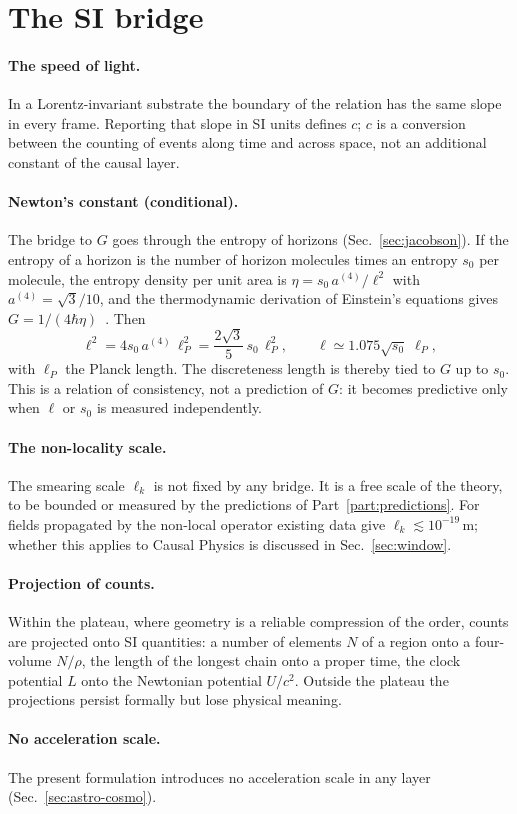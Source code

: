 \section{The SI bridge}\label{sec:bridge}

\paragraph{The speed of light.} In a Lorentz-invariant substrate the boundary of the relation has
the same slope in every frame. Reporting that slope in SI units defines $c$; $c$ is a conversion
between the counting of events along time and across space, not an additional constant of the
causal layer.

\paragraph{Newton's constant (conditional).} The bridge to $G$ goes through the entropy of horizons
(Sec.~\ref{sec:jacobson}). If the entropy of a horizon is the number of horizon molecules times an
entropy $s_0$ per molecule, the entropy density per unit area is $\eta=s_0\,a^{(4)}/\ell^2$ with
$a^{(4)}=\sqrt3/10$, and the thermodynamic derivation of Einstein's equations gives
$G=1/(4\hbar\eta)$~\cite{Jacobson1995}. Then
\begin{equation}\label{eq:lP}
  \ell^2=4s_0\,a^{(4)}\,\ell_P^2=\frac{2\sqrt3}{5}\,s_0\,\ell_P^2,\qquad
  \ell\simeq1.075\sqrt{s_0}\;\ell_P ,
\end{equation}
with $\ell_P$ the Planck length. The discreteness length is thereby tied to $G$ up to $s_0$. This is a
relation of consistency, not a prediction of $G$: it becomes predictive only when $\ell$ or $s_0$ is
measured independently.

\paragraph{The non-locality scale.} The smearing scale $\ell_k$ is not fixed by any bridge. It is a
free scale of the theory, to be bounded or measured by the predictions of Part~\ref{part:predictions}. For
fields propagated by the non-local operator existing data give $\ell_k\lesssim10^{-19}$\,m; whether this
applies to Causal Physics is discussed in Sec.~\ref{sec:window}.

\paragraph{Projection of counts.} Within the plateau, where geometry is a reliable compression of
the order, counts are projected onto SI quantities: a number of elements $N$ of a region onto a
four-volume $N/\rho$, the length of the longest chain onto a proper time, the clock potential $L$
onto the Newtonian potential $U/c^2$. Outside the plateau the projections persist formally but lose
physical meaning.

\paragraph{No acceleration scale.} The present formulation introduces no acceleration scale in any
layer (Sec.~\ref{sec:astro-cosmo}).
